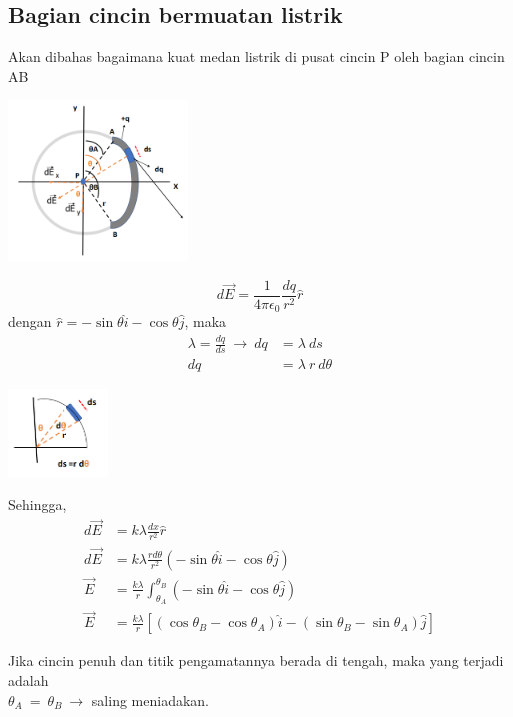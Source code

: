 \documentclass[twocolumn, 11pt]{article}%
\begin{document}
    \subsection{Bagian cincin bermuatan listrik}%
    Akan dibahas bagaimana kuat medan listrik di pusat cincin P oleh bagian cincin AB
    \begin{center}
        \includegraphics[width=180px]{12.png}
    \end{center}

    \[ d \vec E=\frac1{4\pi \epsilon_0} \frac{dq}{r^2}\hat r \]
    dengan $\hat r= -\sin \theta \hat i - \cos \theta \hat j$, maka
    \begin{align*}
        \lambda=\frac{dq}{ds}\ \rightarrow\ dq &= \lambda\ ds\\
        dq &= \lambda\ r\ d\theta
    \end{align*}

    \begin{center}
        \includegraphics[width=100px]{13.png}
    \end{center}

    Sehingga,
    \begin{align*}
        d \vec E &= k \lambda \frac{dx}{r^2} \hat r\\
        d \vec E &= k \lambda \frac{rd \theta}{r^2} (-\sin \theta \hat i - \cos \theta \hat j)\\
        \vec E &= \frac{k \lambda}{r} \int_{\theta_A}^{\theta_B} (-\sin \theta \hat i - \cos \theta \hat j)\\
        \vec E &= \frac{k \lambda}{r} [(\cos \theta_B - \cos \theta_A)\hat i - (\sin \theta_B - \sin \theta_A)\hat j]
    \end{align*}

    Jika cincin penuh dan titik pengamatannya berada di tengah, maka yang terjadi adalah\\ $\theta_A\ =\ \theta_B\ \rightarrow$ saling meniadakan.
\end{document}
